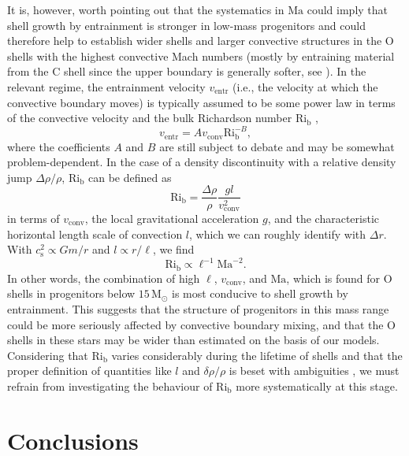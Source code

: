 \documentclass[useAMS,usenatbib]{mnras}
\newcommand{\Msun}{\ensuremath{\mathrm{M}_\odot}}
\begin{document}
It is, however, worth pointing out that the systematics in
$\mathrm{Ma}$ could imply that shell growth by entrainment is stronger
in low-mass progenitors and could therefore help to establish wider
shells and larger convective structures in the O shells with the
highest convective Mach numbers (mostly by entraining material
from the C shell since the upper boundary is generally 
softer, see \citealp{cristini_17}). In the relevant regime, the
entrainment velocity $v_\mathrm{entr}$ (i.e., the velocity at which
the convective boundary moves) is typically assumed to be some power
law in terms of the convective velocity and the bulk Richardson number
$\mathrm{Ri}_\mathrm{b}$
\citep{fernando_91,strang_01,meakin_07,cristini_16},
\begin{equation}
v_\mathrm{entr}=
A v_\mathrm{conv} \mathrm{Ri}_\mathrm{b}^{-B},
\end{equation}
where the coefficients $A$ and $B$ are still subject to debate and may
be somewhat problem-dependent. In the case of a density discontinuity
with a relative density jump $\Delta \rho/\rho$, $\mathrm{Ri}_\mathrm{b}$
can be defined as
\begin{equation}
  \mathrm{Ri}_\mathrm{b}=
  \frac{\Delta \rho}{\rho} \frac{g l}{v_\mathrm{conv}^2}
\end{equation}
in terms of $v_\mathrm{conv}$, the local gravitational acceleration
$g$, and the characteristic horizontal length scale of convection $l$,
which we can roughly identify with $\Delta r$. 
With $c_\mathrm{s}^2\propto Gm/r$ and $l \propto r/\ell$, we find
\begin{equation}
\mathrm{Ri}_\mathrm{b} \propto \ell^{-1} \mathrm{Ma}^{-2}.
\end{equation}
In other words, the combination of high $\ell$, $v_\mathrm{conv}$, and
$\mathrm{Ma}$, which is found for O shells in progenitors below $15
\,\Msun$ is most conducive to shell growth by entrainment. 
This suggests that the structure of progenitors in this mass range
could be more seriously affected by convective boundary mixing, and
that the O shells in these stars may be wider than estimated on the
basis of our models.
Considering that $\mathrm{Ri}_\mathrm{b}$ varies considerably during
the lifetime of shells and that the proper definition of quantities
like $l$ and $\delta \rho/\rho$ is beset with ambiguities
\citep{cristini_16}, we must refrain from investigating the behaviour
of $\mathrm{Ri}_\mathrm{b}$ more systematically at this stage.


\section{Conclusions}
\label{sec:conclusions}
\end{document}
